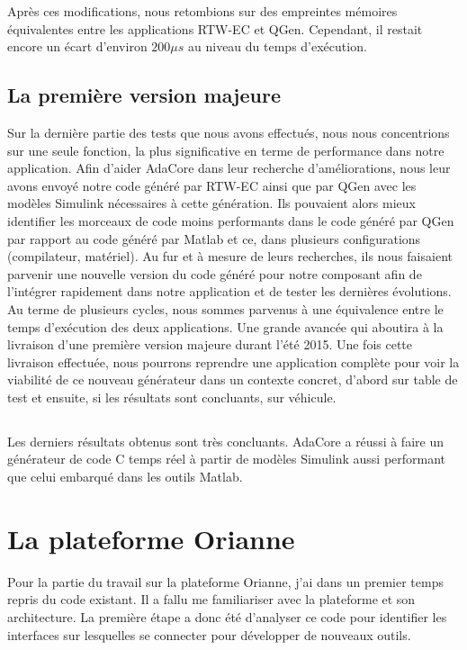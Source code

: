 Après ces modifications, nous retombions sur des empreintes mémoires
équivalentes entre les applications RTW-EC\up{\circledR} et QGen.  Cependant, il
restait encore un écart d'environ $200\mu{}s$ au niveau du temps d'exécution.

\subsection{La première version majeure}
Sur la dernière partie des tests que nous avons effectués, nous nous concentrions
sur une seule fonction, la plus significative en terme de performance dans notre
application. Afin d'aider AdaCore dans leur recherche d'améliorations, nous
leur avons envoyé notre code généré par RTW-EC\up{\circledR} ainsi que par QGen avec
les modèles Simulink\up{\circledR} nécessaires à cette génération. Ils pouvaient
alors mieux identifier les morceaux de code moins performants dans le code
généré par QGen par rapport au code généré par Matlab et ce, dans plusieurs
configurations (compilateur, matériel).
Au fur et à mesure de leurs recherches, ils nous faisaient parvenir une nouvelle
version du code généré pour notre composant afin de l'intégrer rapidement dans
notre application et de tester les dernières évolutions. Au terme de plusieurs
cycles, nous sommes parvenus à une équivalence entre le temps d'exécution des
deux applications. Une grande avancée qui aboutira à la livraison d'une première
version majeure durant l'été 2015. Une fois cette livraison effectuée, nous
pourrons reprendre une application complète pour voir la viabilité de ce nouveau
générateur dans un contexte concret, d'abord sur table de test et ensuite, si
les résultats sont concluants, sur véhicule.

\subsection*{}
Les derniers résultats obtenus sont très concluants. AdaCore a réussi à
faire un générateur de code C temps réel à partir de modèles Simulink\up{\circledR} aussi
performant que celui embarqué dans les outils Matlab\up{\circledR}.

\section{La plateforme Orianne}
Pour la partie du travail sur la plateforme Orianne, j'ai dans un premier temps
repris du code existant. Il a fallu me familiariser avec la plateforme et son
architecture. La première étape a donc été d'analyser ce code pour identifier
les interfaces sur lesquelles se connecter pour développer de nouveaux outils.

